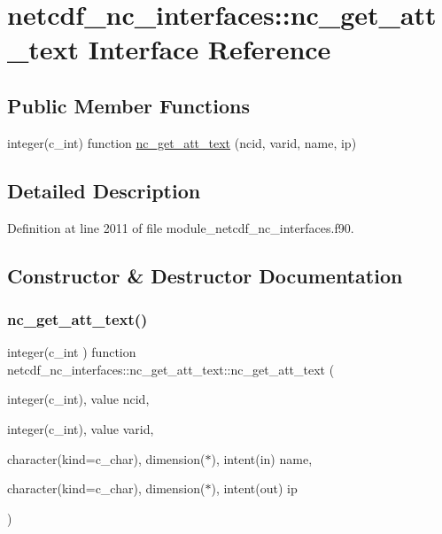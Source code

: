 \hypertarget{interfacenetcdf__nc__interfaces_1_1nc__get__att__text}{}\section{netcdf\+\_\+nc\+\_\+interfaces\+:\+:nc\+\_\+get\+\_\+att\+\_\+text Interface Reference}
\label{interfacenetcdf__nc__interfaces_1_1nc__get__att__text}
\subsection*{Public Member Functions}
\begin{DoxyCompactItemize}
\item 
integer(c\+\_\+int) function \hyperlink{interfacenetcdf__nc__interfaces_1_1nc__get__att__text_aa4f4d77cddde0ceb253950ec4515d1f6}{nc\+\_\+get\+\_\+att\+\_\+text} (ncid, varid, name, ip)
\end{DoxyCompactItemize}


\subsection{Detailed Description}


Definition at line 2011 of file module\+\_\+netcdf\+\_\+nc\+\_\+interfaces.\+f90.



\subsection{Constructor \& Destructor Documentation}
\mbox{\label{interfacenetcdf__nc__interfaces_1_1nc__get__att__text_aa4f4d77cddde0ceb253950ec4515d1f6}} 
\subsubsection{\texorpdfstring{nc\+\_\+get\+\_\+att\+\_\+text()}{nc\_get\_att\_text()}}
{\footnotesize\ttfamily integer(c\+\_\+int ) function netcdf\+\_\+nc\+\_\+interfaces\+::nc\+\_\+get\+\_\+att\+\_\+text\+::nc\+\_\+get\+\_\+att\+\_\+text (\begin{DoxyParamCaption}\item[{integer(c\+\_\+int), value}]{ncid,  }\item[{integer(c\+\_\+int), value}]{varid,  }\item[{character(kind=c\+\_\+char), dimension($\ast$), intent(in)}]{name,  }\item[{character(kind=c\+\_\+char), dimension($\ast$), intent(out)}]{ip }\end{DoxyParamCaption})}



